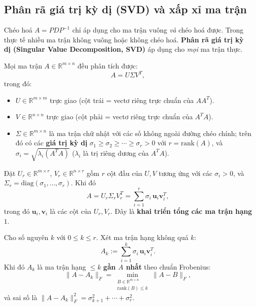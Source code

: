 \documentclass[12pt,a4paper]{article}
\begin{document}
\subsection{Phân rã giá trị kỳ dị (SVD) và xấp xỉ ma trận}

\begin{dongco}
Chéo hoá $A = PDP^{-1}$ chỉ áp dụng cho ma trận vuông \emph{và} chéo hoá được. Trong thực tế nhiều ma trận không vuông hoặc không chéo hoá. \textbf{Phân rã giá trị kỳ dị (Singular Value Decomposition, SVD)} áp dụng cho \emph{mọi} ma trận thực.
\end{dongco}

\begin{dinhly}[title={Phân rã SVD (dạng đầy đủ)}]
Mọi ma trận $A \in \mathbb{R}^{m\times n}$ đều phân tích được:
\[
  A = U \Sigma V^T,
\]
trong đó:
\begin{itemize}
  \item $U \in \mathbb{R}^{m\times m}$ trực giao (cột trái = vectơ riêng trực chuẩn của $AA^T$).
  \item $V \in \mathbb{R}^{n\times n}$ trực giao (cột phải = vectơ riêng trực chuẩn của $A^T A$).
  \item $\Sigma \in \mathbb{R}^{m\times n}$ là ma trận chữ nhật với các số không ngoài đường chéo chính; trên đó có các \textbf{giá trị kỳ dị} $\sigma_1 \ge \sigma_2 \ge \cdots \ge \sigma_r > 0$ với $r = \mathrm{rank}(A)$, và $\sigma_i = \sqrt{\lambda_i(A^T A)}$ ($\lambda_i$ là trị riêng dương của $A^T A$).
\end{itemize}
\end{dinhly}

\begin{congthuc}[title={Dạng mỏng}]
Đặt $U_r \in \mathbb{R}^{m \times r}$, $V_r \in \mathbb{R}^{n \times r}$ gồm $r$ cột đầu của $U, V$ tương ứng với các $\sigma_i > 0$, và $\Sigma_r = \mathrm{diag}(\sigma_1, \ldots, \sigma_r)$. Khi đó
\[
  A = U_r \Sigma_r V_r^T = \sum_{i=1}^r \sigma_i\, \mathbf{u}_i \mathbf{v}_i^T,
\]
trong đó $\mathbf{u}_i, \mathbf{v}_i$ là các cột của $U_r, V_r$. Đây là \textbf{khai triển tổng các ma trận hạng $1$}.
\end{congthuc}

\begin{dinhly}[title={Eckart--Young--Mirsky (trường hợp Frobenius)}]
Cho số nguyên $k$ với $0 \le k \le r$. Xét ma trận hạng không quá $k$:
\[
  A_k := \sum_{i=1}^k \sigma_i\, \mathbf{u}_i \mathbf{v}_i^T.
\]
Khi đó $A_k$ là ma trận hạng $\le k$ \textbf{gần $A$ nhất} theo chuẩn Frobenius:
\[
  \|A - A_k\|_F = \min_{\substack{B \in \mathbb{R}^{m \times n}\\ \mathrm{rank}(B) \le k}} \|A - B\|_F,
\]
và sai số là $\|A - A_k\|_F^2 = \sigma_{k+1}^2 + \cdots + \sigma_r^2$.
\end{dinhly}
\end{document}

